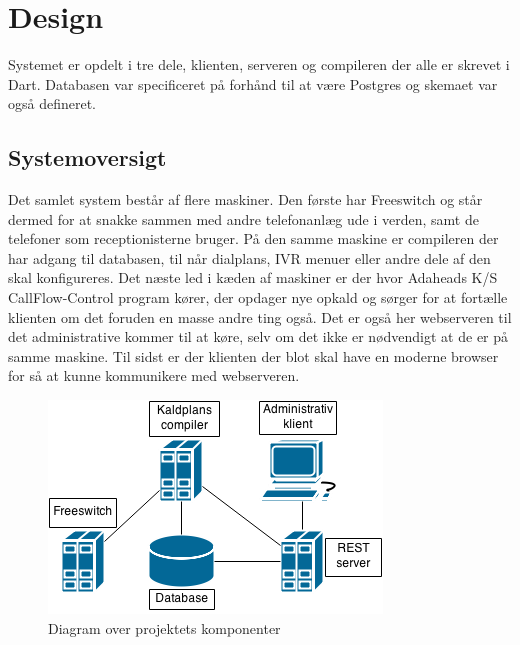 \chapter{Design}
Systemet er opdelt i tre dele, klienten, serveren og compileren der alle er skrevet i Dart. Databasen var specificeret på forhånd til at være Postgres og skemaet var også defineret.


\section{Systemoversigt}
Det samlet system består af flere maskiner. Den første har Freeswitch og står dermed for at snakke sammen med andre telefonanlæg ude i verden, samt de telefoner som receptionisterne bruger. På den samme maskine er compileren der har adgang til databasen, til når dialplans, IVR menuer eller andre dele af den skal konfigureres. Det næste led i kæden af maskiner er der hvor Adaheads K/S CallFlow-Control program kører, der opdager nye opkald og sørger for at fortælle klienten om det foruden en masse andre ting også. Det er også her webserveren til det administrative kommer til at køre, selv om det ikke er nødvendigt at de er på samme maskine. Til sidst er der klienten der blot skal have en moderne browser for så at kunne kommunikere med webserveren.

\begin{figure}[ht!]
\centering
\includegraphics[scale=0.8]{images/systemdiagram.png}
\caption{Diagram over projektets komponenter}
\label{fig:systemdiagram}
\end{figure}


